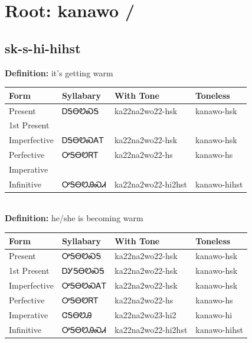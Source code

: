 \documentclass{article}%
\begin{document}
%
\normalsize%
\section*{Root: kanawo / }%
\subsection*{sk-s-hi-hihst}%
\textbf{Definition: }%
it’s getting warm%
\\[0.5em]%
\begin{tabular}{|l|l|l|l|}%
\hline%
\textbf{Form}&\textbf{Syllabary}&\textbf{With Tone}&\textbf{Toneless}\\%
\hline%
Present&ᎠᎦᎾᏬᏍᎦ&ka22na2wo22{-}hsk&kanawo{-}hsk\\%
1st Present&&&\\%
Imperfective&ᎠᎦᎾᏬᏍᎪᎢ&ka22na2wo22{-}hsk&kanawo{-}hsk\\%
Perfective&ᎤᎦᎾᏬᏒᎢ&ka22na2wo22{-}hs&kanawo{-}hs\\%
Imperative&&&\\%
Infinitive&ᎤᎦᎾᏬᎯᏍᏗ&ka22na2wo22{-}hi2hst&kanawo{-}hihst\\%
\hline%
\end{tabular}%
\\[1em]%
\textbf{Definition: }%
he/she is becoming warm%
\\[0.5em]%
\begin{tabular}{|l|l|l|l|}%
\hline%
\textbf{Form}&\textbf{Syllabary}&\textbf{With Tone}&\textbf{Toneless}\\%
\hline%
Present&ᎤᎦᎾᏬᏍᎦ&ka22na2wo22{-}hsk&kanawo{-}hsk\\%
1st Present&ᎠᎩᎦᎾᏬᏍᎦ&ka22na2wo22{-}hsk&kanawo{-}hsk\\%
Imperfective&ᎤᎦᎾᏬᏍᎪᎢ&ka22na2wo22{-}hsk&kanawo{-}hsk\\%
Perfective&ᎤᎦᎾᏬᏒᎢ&ka22na2wo22{-}hs&kanawo{-}hs\\%
Imperative&ᏣᎦᎾᏬᎯ&ka22na2wo23{-}hi2&kanawo{-}hi\\%
Infinitive&ᎤᎦᎾᏬᎯᏍᏗ&ka22na2wo22{-}hi2hst&kanawo{-}hihst\\%
\hline%
\end{tabular}%
\\[1em]%
\end{document}
